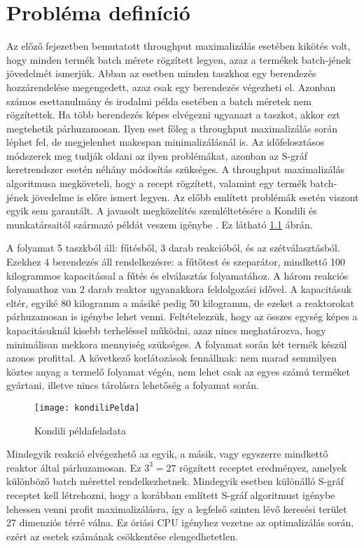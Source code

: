 \chapter{Probléma definíció}
Az előző fejezetben bemutatott throughput maximalizálás esetében kikötés volt, hogy minden termék batch mérete rögzített legyen, azaz a termékek batch-jének jövedelmét ismerjük.
Abban az esetben minden taszkhoz egy berendezés hozzárendelése megengedett, azaz csak egy berendezés végezheti el.
Azonban számos esettanulmány és irodalmi példa esetében a batch méretek nem rögzítettek.
Ha több berendezés képes elvégezni ugyanazt a taszkot, akkor ezt megtehetik párhuzamosan.
Ilyen eset főleg a throughput maximalizálás során léphet fel, de megjelenhet makespan minimalizálásnál is.
Az időfelosztásos módszerek meg tudják oldani az ilyen problémákat, azonban az S-gráf keretrendszer esetén néhány módosítás szükséges.
A throughput maximalizálás algoritmusa megköveteli, hogy a recept rögzített, valamint egy termék batch-jének jövedelme is előre ismert legyen.
Az előbb említett problémák esetén viszont egyik sem garantált. 
A javasolt megközelítés szemléltetésére a Kondili és munkatársaitól származó példát veszem igénybe \cite{kondili}.
Ez látható \ref{kondiliPelda} ábrán.

A folyamat 5 taszkból áll: fűtésből, 3 darab reakcióból, és az szétválasztásból.
Ezekhez 4 berendezés áll rendelkezésre: a fűtőtest és szeparátor, mindkettő 100 kilogrammos kapacitással a fűtés és elválasztás folyamatához.
A három reakciós folyamathoz van 2 darab reaktor ugyanakkora feldolgozási idővel.
A kapacitásuk eltér, egyiké 80 kilogramm a másiké pedig 50 kilogramm, de ezeket a reaktorokat párhuzamosan is igénybe lehet venni.
Feltételezzük, hogy az összes egység képes a kapacitásuknál kisebb terheléssel működni, azaz nincs meghatározva, hogy minimálisan mekkora mennyiség szükséges.
A folyamat során két termék készül azonos profittal.
A következő korlátozások fennállnak: nem marad semmilyen köztes anyag a termelő folyamat végén, nem lehet csak az egyes számú terméket gyártani, illetve nincs tárolásra lehetőség a folyamat során.
\begin{figure}[H]
\begin{center}
\texttt{[image: kondiliPelda]}
\caption{Kondili példafeladata}
\label{kondiliPelda}
\end{center}
\end{figure}

Mindegyik reakció elvégezhető az egyik, a másik, vagy egyszerre mindkettő reaktor által párhuzamosan.
Ez $3^3 = 27$ rögzített receptet eredményez, amelyek különböző batch mérettel rendelkezhetnek.
Mindegyik esetben különálló S-gráf receptet kell létrehozni, hogy a korábban említett S-gráf algoritmust igénybe lehessen venni profit maximalizálásra, így a legfelső szinten lévő keresési terület 27 dimenziós térré válna.
Ez óriási CPU igényhez vezetne az optimalizálás során, ezért az esetek számának csökkentése elengedhetetlen.


